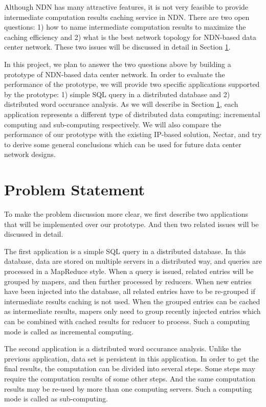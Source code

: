\documentclass[journal]{IEEEtran}
\begin{document}
Although NDN has many attractive features, it is not very feasible to provide
intermediate computation results caching service in NDN.  There are two open
questions: 1) how to name intermediate computation results to maximize the
caching efficiency and 2) what is the best network topology for NDN-based data
center network.  These two issues will be discussed in detail in Section
\ref{sec:problem_statement}.

In this project, we plan to answer the two questions above by building a
prototype of NDN-based data center network.  In order to evaluate the
performance of the prototype, we will provide two specific applications
supported by the prototype: 1) simple SQL query in a distributed database and 2)
distributed word occurance analysis.  As we will describe in Section
\ref{sec:problem_statement}, each application represents a different type of
distributed data computing: incremental computing and sub-computing
respectively.  We will also compare the performance of our prototype with the
existing IP-based solution, Nectar, and try to derive some general conclusions
which can be used for future data center network designs.

\section{Problem Statement}\label{sec:problem_statement}
To make the problem discussion more clear, we first describe two applications
that will be implemented over our prototype. And then two related issues will be
discussed in detail.

The first application is a simple SQL query in a distributed database.  In this
database, data are stored on multiple servers in a distributed way, and queries
are processed in a MapReduce style.  When a query is issued, related entries
will be grouped by mapers, and then further processed by reducers.  When new
entries have been injected into the database, all related entries have to be
re-grouped if intermediate results caching is not used.  When the grouped
entries can be cached as intermediate results, mapers only need to group
recently injected entries which can be combined with cached results for reducer
to process.  Such a computing mode is called as incremental computing.  

The second application is a distributed word occurance analysis.  Unlike the
previous application, data set is persistent in this application.  In order to
get the final results, the computation can be divided into several steps.  Some
steps may require the computation results of some other steps.  And the same
computation results may be re-used by more than one computing servers.  Such a
computing mode is called as sub-computing.
\end{document}
